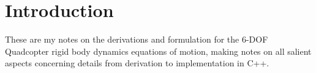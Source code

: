\section{Introduction}

These are my notes on the derivations and formulation for the 6-DOF Quadcopter rigid body dynamics equations of motion, making notes on all salient aspects concerning details from derivation to implementation in C++.

